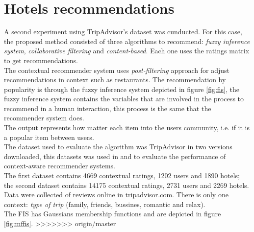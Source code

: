 \section{Hotels recommendations} \label{hotels}

A second experiment using TripAdvisor's dataset was cunducted. 
For this case, the proposed method consisted of three algorithms 
to recommend:  \textit{fuzzy inference system}, \textit{collaborative 
filtering} and \textit{content-based}. Each one uses the ratings 
matrix to get recommendations.\\    
The contextual recommender system uses  \textit{post-filtering}
approach\cite{adomavicius2011context} for adjust recommendations in
context such as restaurants. The recommendation by popularity is 
through the fuzzy inference system depicted in figure \ref{fig:fis}, 
the fuzzy inference
system contains the variables that are involved in the process to
recommend in a human interaction, this process is the same that the
recommender system does. \\The output represents how matter each item
into the users community, i.e. if it is a popular item between users. \\
The dataset used to evaluate the algorithm was TripAdvisor in two
versions downloaded\cite{linkzeng}, this datasets was used in
\cite{zheng2014context} and \cite{zheng2012differential} to  evaluate the
performance of context-aware recommender systems. \\The first
dataset contains 4669 contextual ratings, 1202 users and 1890 hotels;
the second dataset contains 14175 contextual ratings, 2731 users and
2269 hotels. Data were collected of reviews online in tripadvisor.com.
There is only one context: \textit{type of trip} (family, friends, bussines,
romantic and relax).\\ 
The FIS has Gaussians membership functions and are depicted in figure
\ref{fig:mffis}.
>>>>>>> origin/master
